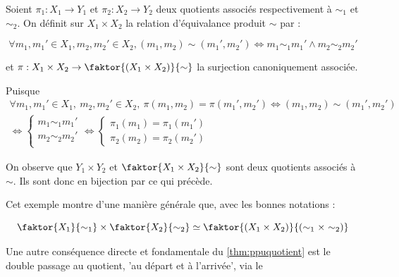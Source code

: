 \begin{example}
    Soient $\pi _1 : X_1 \to Y_1$ et $\pi _2 : X_2 \to Y_2$ deux quotients associés respectivement
    à $\sim _1$ et $\sim _2$.
    On définit sur $X_1 \times X_2$ la relation d'équivalance produit $\sim$ par :

    \[
      \forall m_1,m_1' \in X_1 ,m_2,m_2' \in X_2, (m_1,m_2) \sim (m_1',m_2') \Leftrightarrow m_1 \sim_1 m_1' \wedge m_2 \sim_2 m_2'
    \]  

    et $\pi : X_1 \times X_2 \to \faktor{(X_1 \times X_2)}{\sim }$ la surjection canoniquement associée.

    Puisque 
    \begin{align*}
      \forall m_1,m_1' \in X_1,~ m_2, m_2' \in X_2,~ \pi (m_1,m_2) = \pi (m_1',m_2') \Leftrightarrow (m_1,m_2) \sim (m_1',m_2') \\ 
      \Leftrightarrow \begin{cases}
          m_1 \sim _1 m_1' \\
          m_2 \sim _2 m_2' \\
      \end{cases} \Leftrightarrow 
      \begin{cases}
          \pi _1 (m_1) = \pi _1(m_1') \\ 
          \pi _2 (m_2) = \pi _2(m_2')
      \end{cases}
    \end{align*}

    On observe que $Y_1 \times Y_2$ et $\faktor{X_1 \times X_2}{\sim }$ sont deux quotients associés
    à $\sim $. Ils sont donc en bijection par ce qui précède.

    Cet exemple montre d'une manière générale que, avec les bonnes notations : 

    \[
      \faktor{X_1}{\sim _1} \times \faktor{X_2}{\sim _2} \simeq \faktor{(X_1 \times X_2)}{(\sim _1 \times \sim _2)}
    \]
    
\end{example}

Une autre conséquence directe et fondamentale du \cref{thm:ppuquotient} est le double passage au quotient, 'au départ et à l'arrivée', via le 

